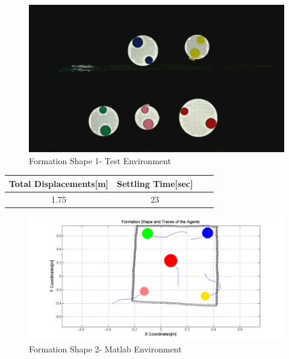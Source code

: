 \documentclass[twoside]{article}
\begin{document}
					\begin{figure}[H]
						\caption{Formation Shape 1- Test Environment}
						\centerline{\includegraphics[scale = 0.35]{2_real_hardware}}
					\end{figure} 
					
						 \begin{center}
						 	 \label{tab:title} 
						 	\begin{tabular}{||c| c |c |c ||}
						 		
						 		\hline
						 		\textbf{Total Displacements[m]}  & \textbf{Settling Time[sec]}\\ 
						 		\hline
						 		1.75 & 23 \\
						 		\hline
						 	\end{tabular}
						 \end{center}
		
					\begin{figure}[H]
						\caption{Formation Shape 2- Matlab Environment}
						\centerline{\includegraphics[scale = 0.45]{4_hardware}}
					\end{figure} 
					
\end{document}
